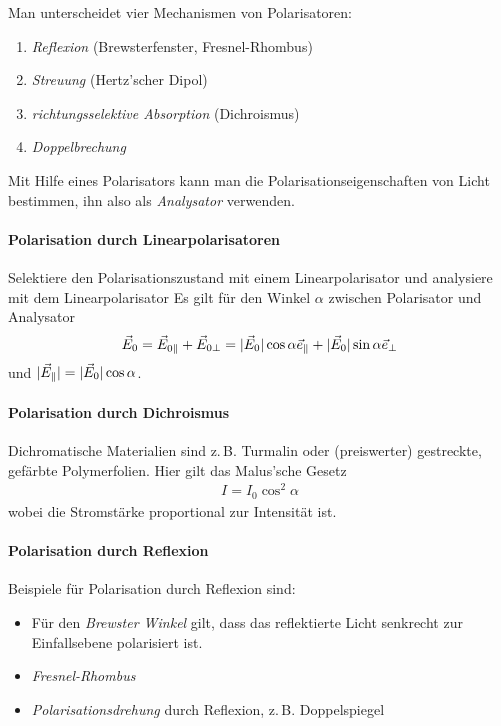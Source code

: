 Man unterscheidet vier Mechanismen von Polarisatoren:
\begin{enumerate}
\item \emph{Reflexion} (Brewsterfenster, Fresnel-Rhombus)
\item \emph{Streuung} (Hertz'scher Dipol)
\item \emph{richtungsselektive Absorption} (Dichroismus)
\item \emph{Doppelbrechung}
\end{enumerate}

Mit Hilfe eines Polarisators kann man die Polarisationseigenschaften
von Licht bestimmen, ihn also als \emph{Analysator}
verwenden.

\paragraph{Polarisation durch Linearpolarisatoren} 
Selektiere den Polarisationszustand mit einem
Linearpolarisator und analysiere mit dem Linearpolarisator
Es gilt für den Winkel $\alpha$ zwischen Polarisator und Analysator
\begin{gather*}
  \vec{E}_0 = \vec{E}_{0\parallel} + \vec{E}_{0\bot} 
  = |\vec{E}_0|\cos\alpha \vec{e}_\parallel
  + |\vec{E}_0|\sin\alpha \vec{e}_\bot
\end{gather*}
und $|\vec{E}_\parallel| = |\vec{E}_0|\cos\alpha$.


\paragraph{Polarisation durch Dichroismus}
Dichromatische Materialien sind z.\,B. Turmalin oder (preiswerter)
gestreckte, gefärbte Polymerfolien.
Hier gilt das Malus'sche Gesetz
\begin{gather*}
  I=I_0\cos^2\alpha
\end{gather*}
wobei die Stromstärke proportional zur Intensität ist.


\paragraph{Polarisation durch Reflexion}
Beispiele für Polarisation durch Reflexion sind:
\begin{itemize}
\item Für den \emph{Brewster Winkel} gilt, dass das reflektierte Licht senkrecht
zur Einfallsebene polarisiert ist.
\item \emph{Fresnel-Rhombus}
\item \emph{Polarisationsdrehung} durch Reflexion, z.\,B. Doppelspiegel
\end{itemize}

